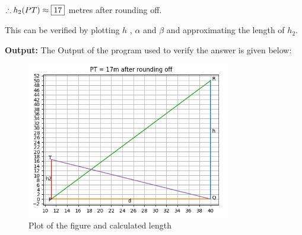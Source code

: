 \documentclass[journal,12pt,twocolumn]{IEEEtran}
\begin{document}
\begin{flushleft}
$\therefore h_2(PT)   \approx \fbox{17} $ metres after rounding off.


This can be verified by plotting $h$ , $\alpha$ and $\beta$ and approximating 
the length of $h_2$.

\noindent\textbf{Output:}
The Output of the program used to verify the answer is given below:

\begin{figure}[h]
\includegraphics[width=252pt]{output.png}
\caption{Plot of the figure and calculated length}
\end{figure}

\end{flushleft}
\end{document}
